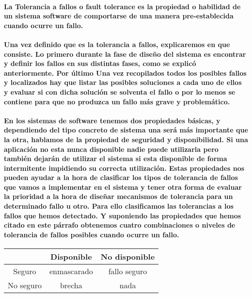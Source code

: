 \documentclass{./llncs2e/llncs}
\begin{document}
\paragraph{
La \textbf{Tolerancia a fallos} o fault tolerance es la propiedad o habilidad de un sistema software de comportarse de una manera pre-establecida cuando ocurre un fallo.
}

\paragraph{
Una vez definido que es la tolerancia a fallos, explicaremos en que consiste. Lo primero durante la fase de diseño del sistema es encontrar y definir los fallos en sus distintas fases, como se explic\'{o} anteriormente. Por \'{u}ltimo Una vez recopilados todos los posibles fallos y localizados hay que listar las posibles soluciones a cada uno de ellos y evaluar si con dicha solución se solventa el fallo o por lo menos se contiene para que no produzca un fallo m\'{a}s grave y problem\'{a}tico.
}
\paragraph{
En los sistemas de software tenemos dos propiedades b\'{a}sicas, y dependiendo del tipo
concreto de sistema una ser\'{a} m\'{a}s importante que la otra, hablamos de la propiedad de seguridad y disponibilidad. Si una aplicación no esta nunca disponible nadie puede utilizarla pero tambi\'{e}n dejar\'{a}n de utilizar el sistema si esta disponible de forma intermitente impidiendo su correcta utilizaci\'{o}n. Estas propiedades nos pueden ayudar a la hora de clasificar los tipos de tolerancia de fallos que vamos a implementar en el sistema y tener otra forma de evaluar
la prioridad a la hora de diseñar mecanismos de tolerancia para un determinado fallo u otro.
Para ello clasificamos las tolerancias a los fallos que hemos detectado. Y suponiendo las propiedades que hemos citado en este p\'{a}rrafo obtenemos cuatro combinaciones o niveles de tolerancia de fallos posibles cuando ocurre un fallo. 
}
\begin{center}
\begin{tabular}{|c|c|c|}
\hline 
 & Disponible & No disponible \\ 
\hline 
Seguro & enmascarado & fallo seguro \\ 
\hline 
No seguro & brecha & nada \\ 
\hline 
\end{tabular} 
\end{center}
\end{document}

